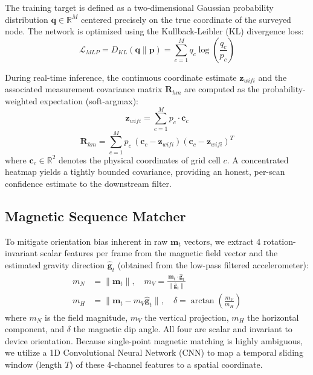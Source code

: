 \documentclass[conference]{IEEEtran}
\begin{document}
The training target is defined as a two-dimensional Gaussian probability distribution $\mathbf{q} \in \mathbb{R}^M$ centered precisely on the true coordinate of the surveyed node. The network is optimized using the Kullback-Leibler (KL) divergence loss:
\begin{equation}
\mathcal{L}_{MLP} = D_{KL}(\mathbf{q} \parallel \mathbf{p}) = \sum_{c=1}^{M} q_c \log \left( \frac{q_c}{p_c} \right) \label{eq:kl_loss}
\end{equation}

During real-time inference, the continuous coordinate estimate $\mathbf{z}_{wifi}$ and the associated measurement covariance matrix $\mathbf{R}_{hm}$ are computed as the probability-weighted expectation (soft-argmax):
\begin{equation}
\mathbf{z}_{wifi} = \sum_{c=1}^{M} p_c \cdot \mathbf{c}_c \label{eq:heatmap_centroid}
\end{equation}
\begin{equation}
\mathbf{R}_{hm} = \sum_{c=1}^{M} p_c\,(\mathbf{c}_c - \mathbf{z}_{wifi})(\mathbf{c}_c - \mathbf{z}_{wifi})^T \label{eq:heatmap_cov}
\end{equation}
where $\mathbf{c}_c \in \mathbb{R}^2$ denotes the physical coordinates of grid cell $c$. A concentrated heatmap yields a tightly bounded covariance, providing an honest, per-scan confidence estimate to the downstream filter.

\subsection{Magnetic Sequence Matcher}

To mitigate orientation bias inherent in raw $\mathbf{m}_t$ vectors, we extract 4 rotation-invariant scalar features per frame from the magnetic field vector and the estimated gravity direction $\hat{\mathbf{g}}_t$ (obtained from the low-pass filtered accelerometer):
\begin{align}
m_N &= \|\mathbf{m}_t\|, \quad m_V = \frac{\mathbf{m}_t \cdot \hat{\mathbf{g}}_t}{\|\hat{\mathbf{g}}_t\|} \nonumber \\
m_H &= \|\mathbf{m}_t - m_V \hat{\mathbf{g}}_t\|, \quad \delta = \arctan\!\left(\frac{m_V}{m_H}\right) \label{eq:mag_features}
\end{align}
where $m_N$ is the field magnitude, $m_V$ the vertical projection, $m_H$ the horizontal component, and $\delta$ the magnetic dip angle. All four are scalar and invariant to device orientation. Because single-point magnetic matching is highly ambiguous, we utilize a 1D Convolutional Neural Network (CNN) to map a temporal sliding window (length $T$) of these 4-channel features to a spatial coordinate.
\end{document}
